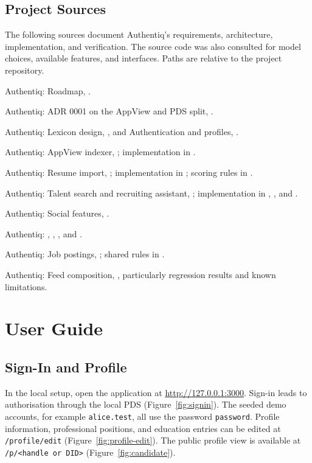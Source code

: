 \documentclass[11pt,a4paper]{article}
\newcommand{\code}[1]{\texttt{#1}}
\newenvironment{reflist}{%
  \begin{list}{}{%
    \setlength{\labelwidth}{2.8em}%
    \setlength{\leftmargin}{3.4em}%
    \setlength{\labelsep}{0.6em}%
    \setlength{\itemsep}{0.25em}%
    \renewcommand{\makelabel}[1]{##1\hfil}}}
  {\end{list}}
\newcommand{\refitem}[1]{\item[\hypertarget{ref:#1}{[#1]}]}
\begin{document}
\subsection{Project Sources}

The following sources document Authentiq's requirements, architecture, implementation, and verification. The source code was also consulted for model choices, available features, and interfaces. Paths are relative to the project repository.

\begin{reflist}
\refitem{P1} Authentiq: Roadmap, .
\refitem{P2} Authentiq: ADR 0001 on the AppView and PDS split, .
\refitem{P3} Authentiq: Lexicon design, , and Authentication and profiles, .
\refitem{P4} Authentiq: AppView indexer, ; implementation in .
\refitem{P5} Authentiq: Resume import, ; implementation in ; scoring rules in .
\refitem{P6} Authentiq: Talent search and recruiting assistant, ; implementation in , , and .
\refitem{P7} Authentiq: Social features, .
\refitem{P8} Authentiq: , , , and .
\refitem{P9} Authentiq: Job postings, ; shared rules in .
\refitem{P10} Authentiq: Feed composition, , particularly regression results and known limitations.
\end{reflist}

\appendix

\section{User Guide}

\subsection{Sign-In and Profile}

In the local setup, open the application at \url{http://127.0.0.1:3000}. Sign-in leads to authorisation through the local PDS (Figure~\ref{fig:signin}). The seeded demo accounts, for example \code{alice.test}, all use the password \code{password}. Profile information, professional positions, and education entries can be edited at \code{/profile/edit} (Figure~\ref{fig:profile-edit}). The public profile view is available at \code{/p/<handle or DID>} (Figure~\ref{fig:candidate}).
\end{document}
